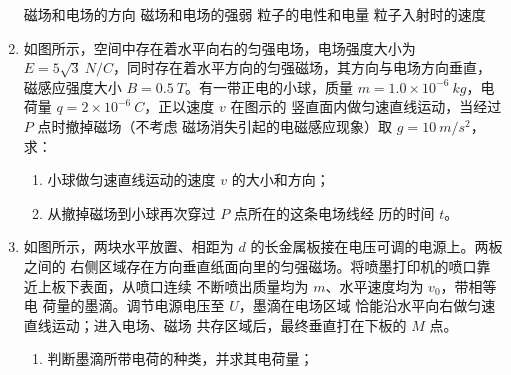 \begin{enumerate}
\fourchoices
{磁场和电场的方向}
{磁场和电场的强弱}
{粒子的电性和电量}
{粒子入射时的速度}


\item 
{}
如图所示，空间中存在着水平向右的匀强电场，电场强度大小为
$ E=5\sqrt{3} \ N/C $，同时存在着水平方向的匀强磁场，其方向与电场方向垂直，磁感应强度大小
$ B=0.5 \ T $。有一带正电的小球，质量 $ m=1.0 \times 10^{-6} \ kg $，电荷量 $ q=2 \times 10^{-6} \ C $，正以速度 $ v $ 在图示的
竖直面内做匀速直线运动，当经过 $ P $ 点时撤掉磁场（不考虑
磁场消失引起的电磁感应现象）取 $ g=10 \ m/s^{2} $，求：
\begin{enumerate}
	\item
小球做匀速直线运动的速度 $ v $ 的大小和方向；


\item 
从撤掉磁场到小球再次穿过 $ P $ 点所在的这条电场线经
历的时间 $ t $。

	
\end{enumerate}
\begin{figure}[h!]
	\flushright
	
\end{figure}




\item 
{}
如图所示，两块水平放置、相距为 $ d $ 的长金属板接在电压可调的电源上。两板之间的
右侧区域存在方向垂直纸面向里的匀强磁场。将喷墨打印机的喷口靠近上板下表面，从喷口连续
不断喷出质量均为 $ m $、水平速度均为 $ v_{0} $，带相等电
荷量的墨滴。调节电源电压至 $ U $，墨滴在电场区域
恰能沿水平向右做匀速直线运动；进入电场、磁场
共存区域后，最终垂直打在下板的 $ M $ 点。
\begin{enumerate}
	\item
判断墨滴所带电荷的种类，并求其电荷量；




\end{enumerate}
\end{enumerate}
